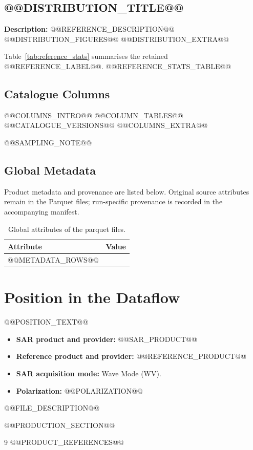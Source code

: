 \documentclass[11pt,a4paper]{article}
\begin{document}
\Needspace{0.43\textheight}
\subsection{@@DISTRIBUTION_TITLE@@}
\textbf{Description:} @@REFERENCE_DESCRIPTION@@
@@DISTRIBUTION_FIGURES@@
@@DISTRIBUTION_EXTRA@@

Table~\ref{tab:reference_stats} summarises the retained @@REFERENCE_LABEL@@.
@@REFERENCE_STATS_TABLE@@

\Needspace{0.65\textheight}
\subsection{Catalogue Columns}
@@COLUMNS_INTRO@@
@@COLUMN_TABLES@@
@@CATALOGUE_VERSIONS@@
@@COLUMNS_EXTRA@@

@@SAMPLING_NOTE@@

\Needspace{0.65\textheight}
\subsection{Global Metadata}
Product metadata and provenance are listed below. Original source attributes remain in the Parquet files; run-specific provenance is recorded in the accompanying manifest.
\begin{table}[H]\centering
\caption{Global attributes of the parquet files.}
\label{tab:metadata}
{\small
\begin{tabular}{@{}>{\raggedright\arraybackslash}p{5.4cm}>{\raggedright\arraybackslash}p{8.9cm}@{}}
\toprule
\textbf{Attribute} & \textbf{Value} \\
\midrule
@@METADATA_ROWS@@
\bottomrule
\end{tabular}
}
\end{table}

\section{Position in the Dataflow}
@@POSITION_TEXT@@

\begin{itemize}
    \item \textbf{SAR product and provider:} @@SAR_PRODUCT@@
    \item \textbf{Reference product and provider:} @@REFERENCE_PRODUCT@@
    \item \textbf{SAR acquisition mode:} Wave Mode (WV).
    \item \textbf{Polarization:} @@POLARIZATION@@
\end{itemize}

\noindent
@@FILE_DESCRIPTION@@

@@PRODUCTION_SECTION@@

\newpage
{}

\begin{thebibliography}{9}
@@PRODUCT_REFERENCES@@
\end{thebibliography}
\end{document}
